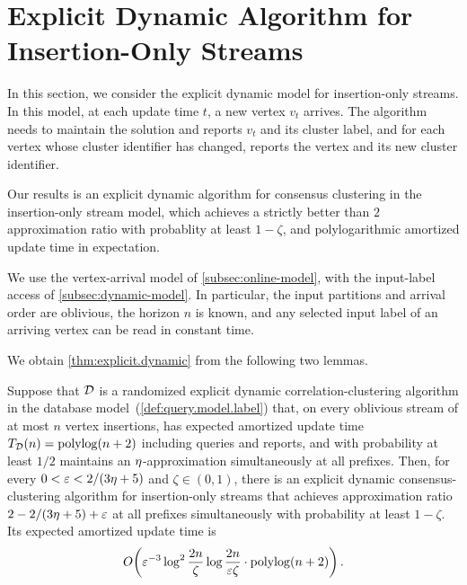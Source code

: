 

\section{Explicit Dynamic Algorithm for Insertion-Only Streams}\label{sec:explicit_dynamic_algorithm_for_insertion_only_stream}

In this section, we consider the explicit dynamic model for insertion-only streams.
In this model, at each update time $ t $, a new vertex $ v_{t} $ arrives.
The algorithm needs to maintain the solution and reports $ v_t $ and its cluster label, and for each vertex whose cluster identifier has changed, reports the vertex and its new cluster identifier.

Our results is an explicit dynamic algorithm for consensus clustering in the insertion-only stream model, which achieves a strictly better than $ 2 $ approximation ratio with probablity at least $ 1-\zeta $, and polylogarithmic amortized update time in expectation.
\ExplicitDynamic*

We use the vertex-arrival model of \cref{subsec:online-model}, with the input-label access of \cref{subsec:dynamic-model}.
In particular, the input partitions and arrival order are oblivious, the horizon $ n $ is known, and any selected input label of an arriving vertex can be read in constant time.

We obtain \cref{thm:explicit.dynamic} from the following two lemmas.

\begin{lemma}\label{lem:explicit.consensus.clustering}
Suppose that $ \mathcal D $ is a randomized explicit dynamic correlation-clustering algorithm in the database model~(\cref{def:query.model.label}) that, on every oblivious stream of at most $ n $ vertex insertions, has expected amortized update time $ T_{\mathcal D}(n)=\operatorname{polylog}(n+2) $ including queries and reports, and with probability at least $ 1/2 $ maintains an $ \eta $-approximation simultaneously at all prefixes.
Then, for every $ 0<\varepsilon<2/(3\eta+5) $ and $ \zeta\in(0,1) $, there is an explicit dynamic consensus-clustering algorithm for insertion-only streams that achieves approximation ratio $ 2-2/(3\eta+5)+\varepsilon $ at all prefixes simultaneously with probability at least $ 1-\zeta $.
Its expected amortized update time is
\begin{align}
    O\!\left(
        \varepsilon^{-3}\log^2\frac{2n}{\zeta}
        \log\frac{2n}{\varepsilon\zeta}\cdot\operatorname{polylog}(n+2)
    \right).
    \label{eq:explicit.consensus.time}
\end{align}
\end{lemma}


